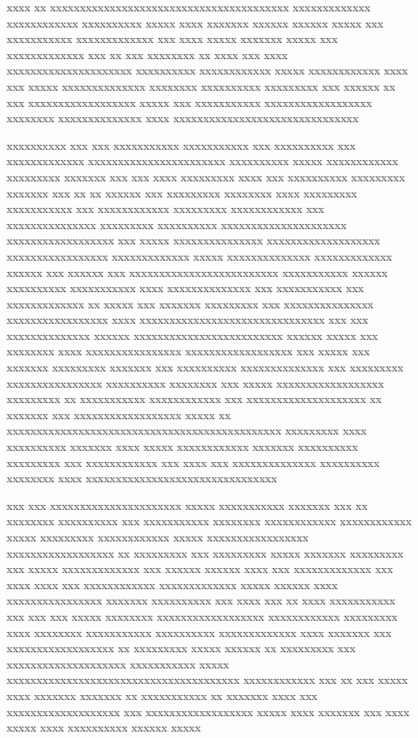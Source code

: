 \begin{introduction}
xxxx xx xxxxxxxxxxxxxxxxxxxxxxxxxxxxxxxxxxxxxxxx xxxxxxxxxxxxx xxxxxxxxxxxx xxxxxxxxxx xxxxx xxxx xxxxxxx xxxxxx xxxxxx xxxxx xxx xxxxxxxxxxx xxxxxxxxxxxxx xxx xxxx xxxxx xxxxxxx xxxxx xxx xxxxxxxxxxxxx xxx xx xxx xxxxxxxx xx xxxx xxx xxxx xxxxxxxxxxxxxxxxxxxxx xxxxxxxxxx xxxxxxxxxxxx xxxxx xxxxxxxxxxxx xxxx xxx xxxxx xxxxxxxxxxxxxx xxxxxxxx xxxxxxxxxx xxxxxxxxx xxx xxxxxx xx xxx xxxxxxxxxxxxxxxxxx xxxxx xxx xxxxxxxxxxx xxxxxxxxxxxxxxxxxx xxxxxxxx xxxxxxxxxxxxxx xxxx xxxxxxxxxxxxxxxxxxxxxxxxxxxxxxx

xxxxxxxxxx xxx xxx xxxxxxxxxxx xxxxxxxxxxx xxx xxxxxxxxxx xxx xxxxxxxxxxxxx xxxxxxxxxxxxxxxxxxxxxxx xxxxxxxxxx xxxxx xxxxxxxxxxxx xxxxxxxxx xxxxxxx xxx xxx xxxx xxxxxxxxx xxxx xxx xxxxxxxxxx xxxxxxxxx xxxxxxx xxx xx xx xxxxxx xxx xxxxxxxxx xxxxxxxx xxxx xxxxxxxxx xxxxxxxxxxx xxx xxxxxxxxxxxx xxxxxxxxx xxxxxxxxxxxx xxx xxxxxxxxxxxxxxx xxxxxxxxx xxxxxxxxxx xxxxxxxxxxxxxxxxxxxxx xxxxxxxxxxxxxxxxxx xxx xxxxx xxxxxxxxxxxxxxx xxxxxxxxxxxxxxxxxxx xxxxxxxxxxxxxxxxx xxxxxxxxxxxxx xxxxx xxxxxxxxxxxxxx xxxxxxxxxxxxx xxxxxx xxx xxxxxx xxx xxxxxxxxxxxxxxxxxxxxxxxxx xxxxxxxxxxx xxxxxx xxxxxxxxxx xxxxxxxxxxx xxxx xxxxxxxxxxxxxx xxx xxxxxxxxxxx xxx xxxxxxxxxxxxx xx xxxxx xxx xxxxxxx xxxxxxxxx xxx xxxxxxxxxxxxxxx xxxxxxxxxxxxxxxxx xxxx xxxxxxxxxxxxxxxxxxxxxxxxxxxxxxx xxx xxx xxxxxxxxxxxxxx xxxxxx xxxxxxxxxxxxxxxxxxxxxxxxx xxxxxx xxxxx xxx xxxxxxxx xxxx xxxxxxxxxxxxxxxx xxxxxxxxxxxxxxxxxx xxx xxxxx xxx xxxxxxx xxxxxxxxx xxxxxxx xxx xxxxxxxxxx xxxxxxxxxxxxxx xxx xxxxxxxxx xxxxxxxxxxxxxxxx xxxxxxxxxx xxxxxxxx xxx xxxxx xxxxxxxxxxxxxxxxxx xxxxxxxxx xx xxxxxxxxxxx xxxxxxxxxxxx xxx xxxxxxxxxxxxxxxxxxxx xx xxxxxxx xxx xxxxxxxxxxxxxxxxxx xxxxx xx xxxxxxxxxxxxxxxxxxxxxxxxxxxxxxxxxxxxxxxxxxxxxx xxxxxxxxx xxxx xxxxxxxxxx xxxxxxx xxxx xxxxx xxxxxxxxxxxx xxxxxxx xxxxxxxxxx xxxxxxxxx xxx xxxxxxxxxxxx xxx xxxx xxx xxxxxxxxxxxxxx xxxxxxxxxx xxxxxxxx xxxx xxxxxxxxxxxxxxxxxxxxxxxxxxxxxxxx

xxx xxx xxxxxxxxxxxxxxxxxxxxxx xxxxx xxxxxxxxxxx xxxxxxx xxx xx xxxxxxxx xxxxxxxxxx xxx xxxxxxxxxxx xxxxxxxx xxxxxxxxxxxx xxxxxxxxxxxx xxxxx xxxxxxxxx xxxxxxxxxxxx xxxxx xxxxxxxxxxxxxxxxx xxxxxxxxxxxxxxxxxx xx xxxxxxxxx xxx xxxxxxxxx xxxxx xxxxxxx xxxxxxxxx xxx xxxxx xxxxxxxxxxxxx xxx xxxxxx xxxxxx xxxx xxx xxxxxxxxxxxxx xxx xxxx xxxx xxx xxxxxxxxxxxx xxxxxxxxxxxxx xxxxx xxxxxx xxxx xxxxxxxxxxxxxxxx xxxxxxx xxxxxxxxxx xxx xxxx xxx xx xxxx xxxxxxxxxxx xxx xxx xxx xxxxx xxxxxxxx xxxxxxxxxxxxxxxxxx xxxxxxxxxxxx xxxxxxxxx xxxx xxxxxxxx xxxxxxxxxxx xxxxxxxxxx xxxxxxxxxxxxx xxxx xxxxxxx xxx xxxxxxxxxxxxxxxxxx xx xxxxxxxxx xxxxx xxxxxx xx xxxxxxxxx xxx xxxxxxxxxxxxxxxxxxxx xxxxxxxxxxx xxxxx xxxxxxxxxxxxxxxxxxxxxxxxxxxxxxxxxxxxxxx xxxxxxxxxxxx xxx xx xxx xxxxx xxxx xxxxxxx xxxxxxx xx xxxxxxxxxxx xx xxxxxxx xxxx xxx xxxxxxxxxxxxxxxxxxx xxx xxxxxxxxxxxxxxxxxx xxxxx xxxx xxxxxxx xxx xxxx xxxxx xxxx xxxxxxxxxx xxxxxx xxxxx


\end{introduction}
